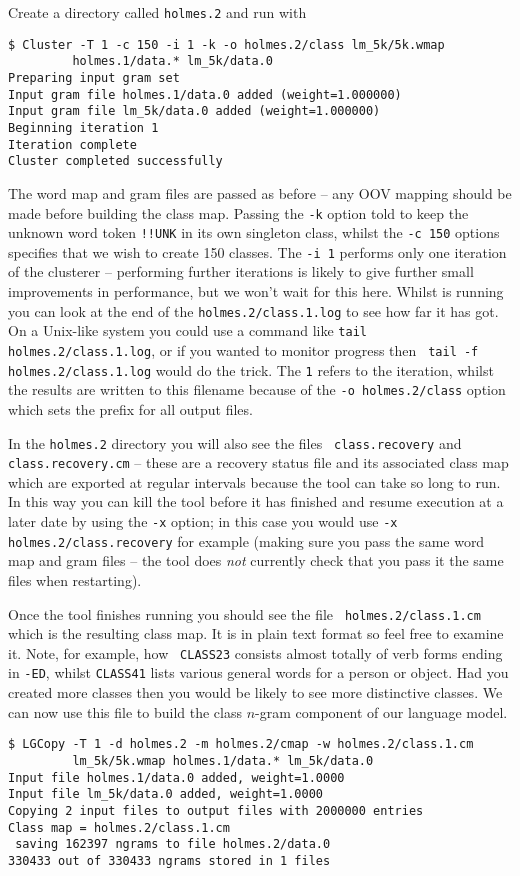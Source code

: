 Create a directory called {\tt holmes.2} and run  with
\begin{verbatim}
$ Cluster -T 1 -c 150 -i 1 -k -o holmes.2/class lm_5k/5k.wmap
         holmes.1/data.* lm_5k/data.0
Preparing input gram set
Input gram file holmes.1/data.0 added (weight=1.000000)
Input gram file lm_5k/data.0 added (weight=1.000000)
Beginning iteration 1
Iteration complete
Cluster completed successfully
\end{verbatim} %
The word map and gram files are passed as before -- any OOV mapping
should be made before building the class map.  Passing the {\tt -k}
option told  to keep the unknown word token {\tt !!UNK}
in its own singleton class, whilst the {\tt -c 150} options specifies
that we wish to create 150 classes.  The {\tt -i 1} performs only one
iteration of the clusterer -- performing further iterations is likely
to give further small improvements in performance, but we won't wait
for this here.  Whilst  is running you can look at the
end of the {\tt holmes.2/class.1.log} to see how far it has got.  On a
Unix-like system you could use a command like {\tt tail
holmes.2/class.1.log}, or if you wanted to monitor progress then {\tt
tail -f holmes.2/class.1.log} would do the trick.  The {\tt 1} refers
to the iteration, whilst the results are written to this filename
because of the {\tt -o holmes.2/class} option which sets the prefix
for all output files.

In the {\tt holmes.2} directory you will also see the files {\tt
class.recovery} and {\tt class.recovery.cm} -- these are a recovery
status file and its associated class map which are exported at regular
intervals because the  tool can take so long to run.
In this way you can kill the tool before it has finished and resume
execution at a later date by using the {\tt -x} option; in this case
you would use {\tt -x holmes.2/class.recovery} for example (making
sure you pass the same word map and gram files -- the tool does
{\it not} currently check that you pass it the same files when restarting).

Once the tool finishes running you should see the file {\tt
holmes.2/class.1.cm} which is the resulting class map.  It is in plain
text format so feel free to examine it.  Note, for example, how {\tt
CLASS23} consists almost totally of verb forms ending in {\tt -ED},
whilst {\tt CLASS41} lists various general words for a person or
object.  Had you created more classes then you would be likely to see
more distinctive classes.  We can now use this file to build the class
$n$-gram component of our language model.
\begin{verbatim}
$ LGCopy -T 1 -d holmes.2 -m holmes.2/cmap -w holmes.2/class.1.cm
         lm_5k/5k.wmap holmes.1/data.* lm_5k/data.0
Input file holmes.1/data.0 added, weight=1.0000
Input file lm_5k/data.0 added, weight=1.0000
Copying 2 input files to output files with 2000000 entries
Class map = holmes.2/class.1.cm
 saving 162397 ngrams to file holmes.2/data.0 
330433 out of 330433 ngrams stored in 1 files
\end{verbatim} %

